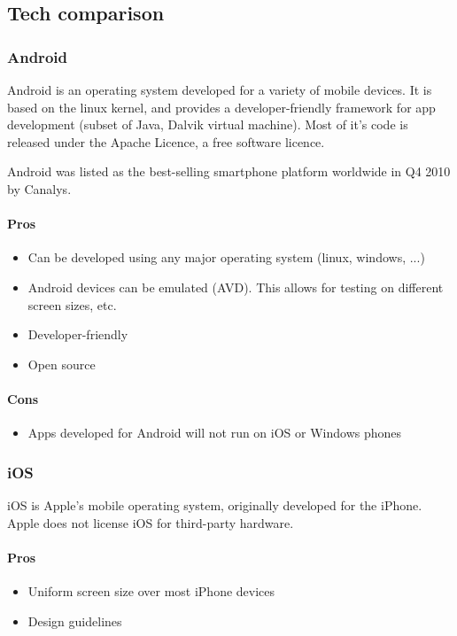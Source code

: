 \subsection{Tech comparison}

\subsubsection{Android}

	Android is an operating system developed for a variety of mobile devices.
	It is based on the linux kernel, and provides a developer-friendly
	framework for app development (subset of Java, Dalvik virtual machine).
	Most of it's code is released under the Apache Licence, a free software
	licence.

	Android was listed as the best-selling smartphone platform worldwide in Q4
	2010 by Canalys. \cite{wiki:android}

	\paragraph{Pros}
		\begin{itemize}
			\item Can be developed using any major operating system (linux, windows, ...)
			\item Android devices can be emulated (AVD). This allows for testing on
			different screen sizes, etc.
			\item Developer-friendly
			\item Open source
		\end{itemize}

	\paragraph{Cons}
		\begin{itemize}
			\item Apps developed for Android will not run on iOS or Windows phones
		\end{itemize}

\subsubsection{iOS}

	iOS is Apple's mobile operating system, originally developed for the
	iPhone. Apple does not license iOS for third-party hardware.

	\paragraph{Pros}
	\begin{itemize}
		\item Uniform screen size over most iPhone devices
		\item Design guidelines
	\end{itemize}

